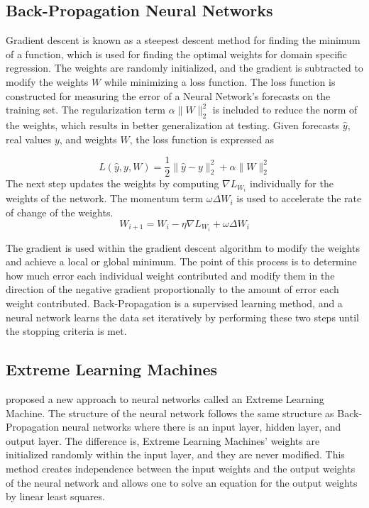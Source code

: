 \subsection{Back-Propagation Neural Networks}\label{subsec:back-propagation-neural-networks}
Gradient descent is known as a steepest descent method for finding the minimum of a function, which is used for finding the optimal weights for domain specific regression.
The weights are randomly initialized, and the gradient is subtracted to modify the weights $W$ while minimizing a loss function.
The loss function is constructed for measuring the error of a Neural Network's forecasts on the training set.
The regularization term $\alpha \lVert W \rVert_2^2$ is included to reduce the norm of the weights, which results in better generalization at testing.
Given forecasts $\hat{y}$, real values $y$, and weights $W$, the loss function is expressed as

\begin{equation}
	L(\hat{y},y,W)=\dfrac{1}{2} \lVert \hat{y}-y \rVert_{2}^{2} + \alpha \lVert W \rVert_{2}^{2}\label{eq:equation}
\end{equation}
	The next step updates the weights by computing $\nabla L_{W_i}$ individually for the weights of the network.
	The momentum term $\omega \Delta W_i$ is used to accelerate the rate of change of the weights.
\begin{equation}
	W_{i+1}=W_i - \eta \nabla L_{W_{i}} + \omega \Delta W_i\label{eq:equation2}
\end{equation}

The gradient is used within the gradient descent algorithm to modify the weights and achieve a local or global minimum.
The point of this process is to determine how much error each individual weight contributed and modify them in the direction of the negative gradient proportionally to the amount of error each weight contributed.
Back-Propagation is a supervised learning method, and a neural network learns the data set iteratively by performing these two steps until the stopping criteria is met.

\subsection{Extreme Learning Machines}\label{subsec:extreme-learning-machines}
\citet{Huang:2006} proposed a new approach to neural networks called an Extreme Learning Machine.
The structure of the neural network follows the same structure as Back-Propagation neural networks where there is an input layer, hidden layer, and output layer.
The difference is, Extreme Learning Machines' weights are initialized randomly within the input layer, and they are never modified.
This method creates independence between the input weights and the output weights of the neural network and allows one to solve an equation for the output weights by linear least squares.

